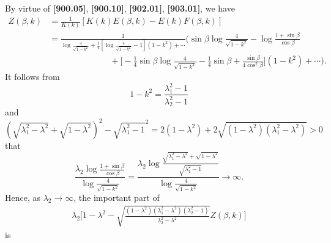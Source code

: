 \documentclass[11pt]{amsart}
\numberwithin{equation}{section}
\numberwithin{figure}{section}
\theoremstyle{plain} %
\theoremstyle{definition} %
\begin{document}
By virtue of \textbf{[900.05]}, \textbf{[900.10]}, \textbf{[902.01]}, \textbf{[903.01]}, we have 
\begin{align*}
Z(\beta,k) 
& = \frac{1}{K (k)} [ K (k) E (\beta,k) - E (k) F(\beta,k)] \\
& = \frac{1}{\log \frac{4}{\sqrt{1-k^2}}+\frac{1}{4}[ \log \frac{4}{\sqrt{1-k^2}}-1 ](1-k^2)+\cdots} 
\bigg( \sin\beta\log \frac{4}{\sqrt{1-k^2}}-\log \frac{1+\sin\beta}{\cos\beta} \\
& \hspace{85pt} +\bigg[ -\frac{1}{4} \sin\beta\log \frac{4}{\sqrt{1-k^2}} 
   -\frac{1}{4} \sin\beta+\frac{\sin\beta}{4\cos^2\beta} \bigg] (1-k^2) +\cdots\bigg). 
\end{align*}
It follows from 
\[
1-k^2 = \frac{\lambda_1^2-1}{\lambda_2^2-1}
\]
and 
\[
\left(\sqrt{\lambda_1^2-\lambda^2}+\sqrt{1-\lambda^2}\right)^2-\sqrt{\lambda_1^2-1}^2
=2(1-\lambda^2) +2\sqrt{(1-\lambda^2)(\lambda_1^2-\lambda^2)} >0 
\]
that 
\[
\frac{\lambda_2 \log \frac{1+\sin\beta}{\cos\beta}}{\log \frac{4}{\sqrt{1-k^2}}} 
= \frac{\lambda_2 \log \frac{\sqrt{\lambda_1^2-\lambda^2}+\sqrt{1-\lambda^2}}{\sqrt{\lambda_1^2-1}}}{\log \frac{4}{\sqrt{1-k^2}}} \to\infty. 
\] 
Hence, as $\lambda_2\to \infty$, the important part of 
\begin{align*}
\lambda_2 \bigg[ 1-\lambda^2  -\sqrt{ \frac{(1-\lambda^2)(\lambda_1^2-\lambda^2)(\lambda_2^2-1)}{\lambda_2^2-\lambda^2}} Z(\beta,k)  \bigg]
\end{align*}
is 
\end{document}
